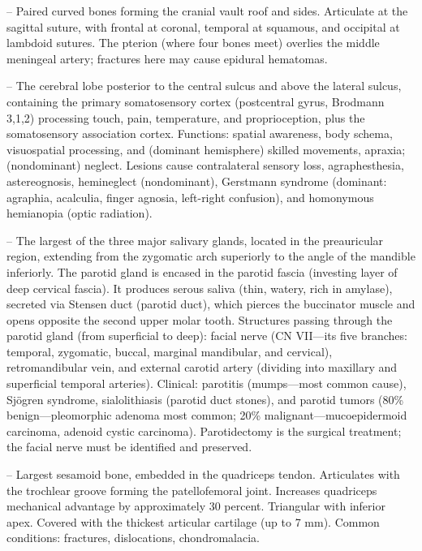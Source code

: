 -- Paired curved bones forming the cranial vault roof and sides. Articulate at the sagittal suture, with frontal at coronal, temporal at squamous, and occipital at lambdoid sutures. The pterion (where four bones meet) overlies the middle meningeal artery; fractures here may cause epidural hematomas.

-- The cerebral lobe posterior to the central sulcus and above the lateral sulcus, containing the primary somatosensory cortex (postcentral gyrus, Brodmann 3,1,2) processing touch, pain, temperature, and proprioception, plus the somatosensory association cortex. Functions: spatial awareness, body schema, visuospatial processing, and (dominant hemisphere) skilled movements, apraxia; (nondominant) neglect. Lesions cause contralateral sensory loss, agraphesthesia, astereognosis, hemineglect (nondominant), Gerstmann syndrome (dominant: agraphia, acalculia, finger agnosia, left-right confusion), and homonymous hemianopia (optic radiation).

-- The largest of the three major salivary glands, located in the preauricular region, extending from the zygomatic arch superiorly to the angle of the mandible inferiorly. The parotid gland is encased in the parotid fascia (investing layer of deep cervical fascia). It produces serous saliva (thin, watery, rich in amylase), secreted via Stensen duct (parotid duct), which pierces the buccinator muscle and opens opposite the second upper molar tooth. Structures passing through the parotid gland (from superficial to deep): facial nerve (CN VII—its five branches: temporal, zygomatic, buccal, marginal mandibular, and cervical), retromandibular vein, and external carotid artery (dividing into maxillary and superficial temporal arteries). Clinical: parotitis (mumps—most common cause), Sjögren syndrome, sialolithiasis (parotid duct stones), and parotid tumors (80\% benign—pleomorphic adenoma most common; 20\% malignant—mucoepidermoid carcinoma, adenoid cystic carcinoma). Parotidectomy is the surgical treatment; the facial nerve must be identified and preserved.

-- Largest sesamoid bone, embedded in the quadriceps tendon. Articulates with the trochlear groove forming the patellofemoral joint. Increases quadriceps mechanical advantage by approximately 30 percent. Triangular with inferior apex. Covered with the thickest articular cartilage (up to 7 mm). Common conditions: fractures, dislocations, chondromalacia.

